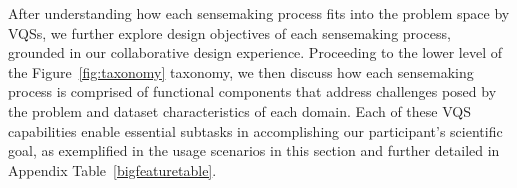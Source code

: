 
  After understanding how each sensemaking process fits into the problem space  by VQSs, we further explore design objectives of each sensemaking process, grounded in our collaborative design experience. Proceeding to the lower level of the Figure~\ref{fig:taxonomy} taxonomy, we then discuss how each sensemaking process is comprised of functional components that address challenges posed by the problem and dataset characteristics of each domain. Each of these VQS capabilities enable essential subtasks in accomplishing our participant's scientific goal, as exemplified in the usage scenarios in this section and further detailed in Appendix Table~\ref{bigfeaturetable}.
